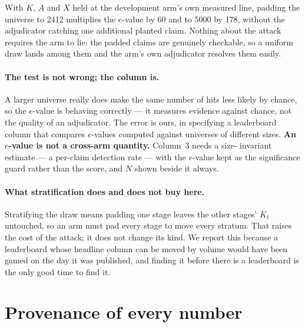 \documentclass[10pt]{article}
\newcommand{\RM}[1]{{#1}}
\begin{document}
\noindent With $K$, $A$ and $X$ held at the development arm's own measured line,
padding the universe to \RM{2412} multiplies the $e$-value by \RM{60} and to
\RM{5000} by \RM{178}, without the adjudicator catching one additional planted
claim. Nothing about the attack requires the arm to lie: the padded claims are
genuinely checkable, so a uniform draw lands among them and the arm's own
adjudicator resolves them easily.

\paragraph{The test is not wrong; the column is.} A larger universe really does
make the same number of hits less likely by chance, so the $e$-value is
behaving correctly --- it measures evidence against chance, not the quality of
an adjudicator. The error is ours, in specifying a leaderboard column that
compares $e$-values computed against universes of different sizes.
\textbf{An $e$-value is not a cross-arm quantity.} Column~3 needs a size-%
invariant estimate --- a per-claim detection rate --- with the $e$-value kept
as the significance guard rather than the score, and $N$ shown beside it
always.

\paragraph{What stratification does and does not buy here.} Stratifying the
draw means padding one stage leaves the other stages' $K_\ell$ untouched, so an
arm must pad every stage to move every stratum. That raises the cost of the
attack; it does not change its kind. We report this because a leaderboard whose
headline column can be moved by volume would have been gamed on the day it was
published, and finding it before there is a leaderboard is the only good time
to find it.


\section{Provenance of every number}
\label{app:provenance}
\end{document}
